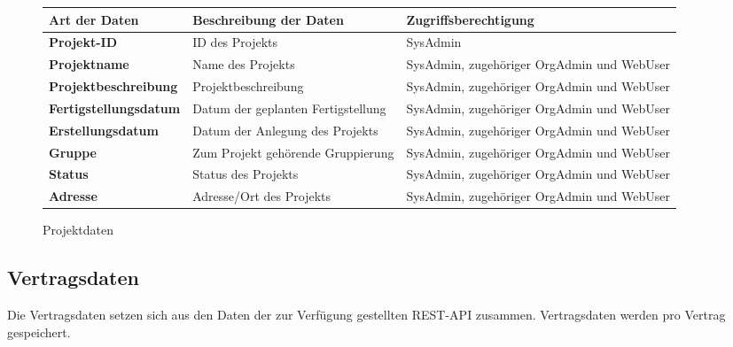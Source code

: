 \begin{figure}[h]
	\centering
	\begin{tabularx}{\textwidth}{| X || X | X |}
        \hline
		\textbf{Art der Daten} & \textbf{Beschreibung der Daten} & \textbf{Zugriffsberechtigung} \\ \hline \hline
        \textbf{Projekt-ID} & ID des Projekts & SysAdmin \\ \hline
		\textbf{Projektname} & Name des Projekts & SysAdmin, zugehöriger OrgAdmin und WebUser \\ \hline
		\textbf{Projektbeschreibung} & Projektbeschreibung & SysAdmin, zugehöriger OrgAdmin und WebUser \\ \hline
		\textbf{Fertigstellungsdatum} & Datum der geplanten Fertigstellung & SysAdmin, zugehöriger OrgAdmin und WebUser \\ \hline
        \textbf{Erstellungsdatum} & Datum der Anlegung des Projekts & SysAdmin, zugehöriger OrgAdmin und WebUser \\ \hline
        \textbf{Gruppe} & Zum Projekt gehörende Gruppierung & SysAdmin, zugehöriger OrgAdmin und WebUser \\ \hline
        \textbf{Status} & Status des Projekts & SysAdmin, zugehöriger OrgAdmin und WebUser \\ \hline
        \textbf{Adresse} & Adresse/Ort des Projekts & SysAdmin, zugehöriger OrgAdmin und WebUser \\ \hline
	\end{tabularx}
	\caption{Projektdaten}
	\label{fig:Projektdaten}
\end{figure}

\subsection{Vertragsdaten}

Die Vertragsdaten setzen sich aus den Daten der zur Verf\"ugung gestellten REST-API zusammen. Vertragsdaten werden pro Vertrag gespeichert.


